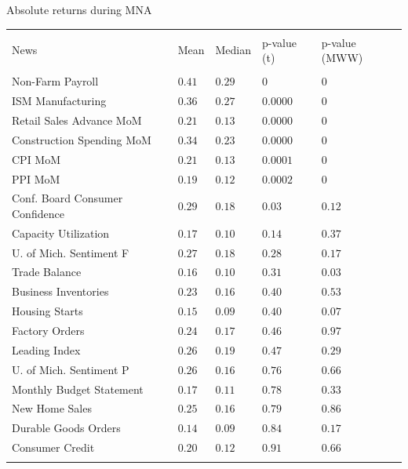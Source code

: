 \documentclass{beamer}
\begin{document}
\begin{frame}{Absolute returns during MNA}
\begin{table}[!htbp] \centering 
\begin{tabular}{@{\extracolsep{2pt}} lllll} 
\\[-1.8ex]\hline 
\hline \\[-1.8ex] 
News & Mean & Median & p-value (t) & p-value (MWW) \\ 
\hline \\[-1.8ex] 
Non-Farm Payroll & $0.41$ & $0.29$ & $0$ & $0$ \\ 
ISM Manufacturing & $0.36$ & $0.27$ & $0.0000$ & $0$ \\ 
Retail Sales Advance MoM & $0.21$ & $0.13$ & $0.0000$ & $0$ \\ 
Construction Spending MoM & $0.34$ & $0.23$ & $0.0000$ & $0$ \\ 
CPI MoM & $0.21$ & $0.13$ & $0.0001$ & $0$ \\ 
PPI MoM & $0.19$ & $0.12$ & $0.0002$ & $0$ \\ 
Conf. Board Consumer Confidence & $0.29$ & $0.18$ & $0.03$ & $0.12$ \\ 
Capacity Utilization & $0.17$ & $0.10$ & $0.14$ & $0.37$ \\ 
U. of Mich. Sentiment F & $0.27$ & $0.18$ & $0.28$ & $0.17$ \\ 
Trade Balance & $0.16$ & $0.10$ & $0.31$ & $0.03$ \\ 
Business Inventories & $0.23$ & $0.16$ & $0.40$ & $0.53$ \\ 
Housing Starts & $0.15$ & $0.09$ & $0.40$ & $0.07$ \\ 
Factory Orders & $0.24$ & $0.17$ & $0.46$ & $0.97$ \\ 
Leading Index & $0.26$ & $0.19$ & $0.47$ & $0.29$ \\ 
U. of Mich. Sentiment P & $0.26$ & $0.16$ & $0.76$ & $0.66$ \\ 
Monthly Budget Statement & $0.17$ & $0.11$ & $0.78$ & $0.33$ \\ 
New Home Sales & $0.25$ & $0.16$ & $0.79$ & $0.86$ \\ 
Durable Goods Orders & $0.14$ & $0.09$ & $0.84$ & $0.17$ \\ 
Consumer Credit & $0.20$ & $0.12$ & $0.91$ & $0.66$ \\ 
\hline \\[-1.8ex] 
\end{tabular} 
\end{table}
\end{frame}
\end{document}
